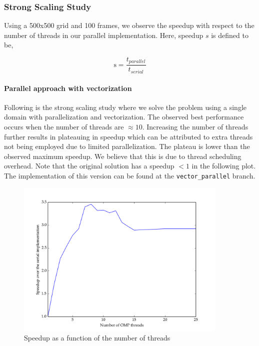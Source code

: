 \documentclass[11pt]{article}
\begin{document}
\subsubsection{Strong Scaling Study}
Using a 500x500 grid and 100 frames, we observe the speedup with respect to the number of threads in our parallel implementation. Here, speedup $s$ is defined to be,  

\begin{equation}
	\mathrm{s} = \dfrac{t_{parallel}}{t_{serial}}
\end{equation}

\paragraph{Parallel approach with vectorization}

Following is the strong scaling study where we solve the problem using a single domain with parallelization and vectorization. The observed best performance occurs when the number of threads are $\approx10$. Increasing the number of threads further results in plateauing in speedup which can be attributed to extra threads not being employed due to limited parallelization. The plateau is lower than the observed maximum speedup. We believe that this is due to thread scheduling overhead. Note that the original solution has a speedup $< 1$ in the following plot. The implementation of this version can be found at the \texttt{vector\_parallel} branch.

\begin{figure}[H]
    \includegraphics[width=0.9\textwidth]{./strong_scaling/strong_scaling_vector_parallel.png}
    \caption{Speedup as a function of the number of threads}
    \label{fig:strong_scaling}
\end{figure} 
\end{document}
